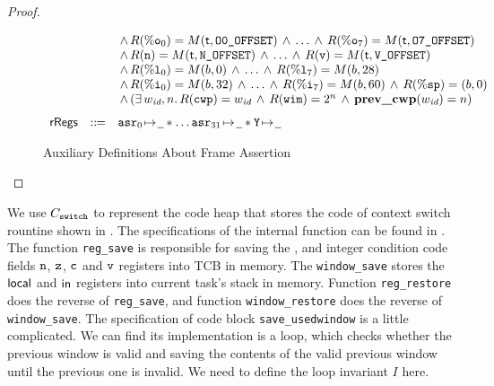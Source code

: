 \begin{proof}
\begin{enumerate}
\begin{figure}[!t]
\[\begin{array}{lcl}
                    & & \, \land \, 
                    \RFile(\oreg{0}) = \Mem(\thrdid, \ofsOOne) \, \land \, \dots \, \land \, 
                    \RFile(\oreg{7}) = \Mem(\thrdid, \ofsOEig)  \\
                    & & \, \land \, 
                    \RFile(\regn) = \Mem(\thrdid, \ofsN) \, \land \, \dots \, \land \, 
                    \RFile(\regv) = \Mem(\thrdid, \ofsV) \\
                    & & \, \land \, 
                    \RFile(\lreg{0}) = \Mem(\block, 0) \, \land \, \dots \, \land \, 
                    \RFile(\lreg{7}) = \Mem(\block, 28) \\
                    & & \, \land \, 
                    \RFile(\ireg{0}) = \Mem(\block, 32) \, \land \, \dots \, \land \, 
                    \RFile(\ireg{7}) = \Mem(\block, 60) \, \land \, 
                    \RFile(\spreg) = (\block, 0) \\
                    & & \, \land \, 
                    (\exists \, \cwp, n. \, \RFile(\regcwp) = \cwp \, \land \, 
                    \RFile(\regwim) = 2^n \, \land \, \prevcwp{(\cwp)} = n) \\
                    \\[-5pt]
                    \rRegs & \define & \regst{\asr_0}{\notCare} \sepstar \dots 
                        \regst{\asr_{31}}{\notCare} \sepstar \regst{\regY}{\notCare} 
                \end{array}
            \]
            \caption{Auxiliary Definitions About Frame Assertion}
        \end{figure}
    \end{enumerate} 
\end{proof}

We use $C_{\texttt{switch}}$ to represent the 
code heap that stores the code of context switch rountine shown 
in \Fig{\ref{fig:Main function of context switch routine}}. 
The specifications of the internal function can be found in 
\Fig{\ref{fig:Specifications of Internal Functions}}. The 
function \texttt{reg\_save} is responsible for saving the 
\localRN{}, \inRN{} and integer condition code fields $\texttt{n}$, 
$\texttt{z}$, $\texttt{c}$ and $\texttt{v}$ registers into TCB in memory. 
The \texttt{window\_save} stores the 
$\textsf{local}$ and $\textsf{in}$ registers into current task's stack in memory. 
Function \texttt{reg\_restore} does the reverse of 
\texttt{reg\_save}, and function \texttt{window\_restore} does the 
reverse of \texttt{window\_save}. The specification of code block 
\texttt{save\_usedwindow} is a little complicated. 
We can find its implementation is a loop, which checks whether the 
previous window is valid and saving the contents of the valid 
previous window until the previous one is invalid. 
We need to define the loop invariant $I$ here. 

